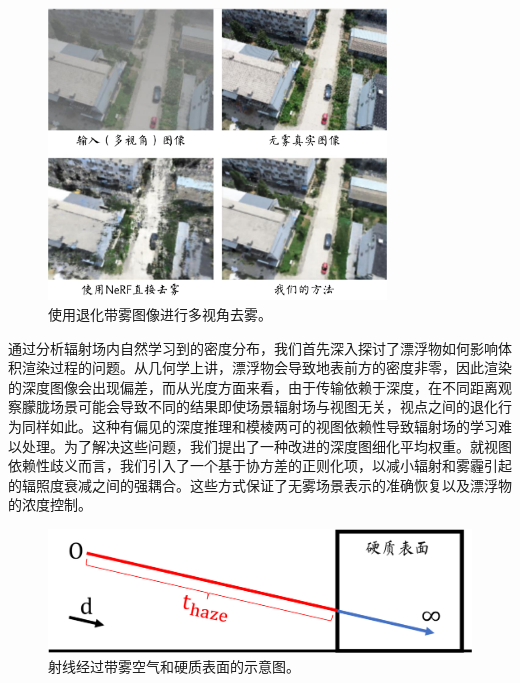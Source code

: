 \begin{figure}[ht]
    \centering
    \includegraphics[width=0.8\textwidth]{undergraduate-thesis/images/dehazing-nerf/teaser.pdf}
    \caption{使用退化带雾图像进行多视角去雾。}
    \label{fig:dehazing-nerf teaser}
\end{figure}

通过分析辐射场内自然学习到的密度分布，我们首先深入探讨了漂浮物如何影响体积渲染过程的问题。从几何学上讲，漂浮物会导致地表前方的密度非零，因此渲染的深度图像会出现偏差，而从光度方面来看，由于传输依赖于深度，在不同距离观察朦胧场景可能会导致不同的结果即使场景辐射场与视图无关，视点之间的退化行为同样如此。这种有偏见的深度推理和模棱两可的视图依赖性导致辐射场的学习难以处理。为了解决这些问题，我们提出了一种改进的深度图细化平均权重。就视图依赖性歧义而言，我们引入了一个基于协方差的正则化项，以减小辐射和雾霾引起的辐照度衰减之间的强耦合。这些方式保证了无雾场景表示的准确恢复以及漂浮物的浓度控制。

\begin{figure}[ht]
    \centering
    \includegraphics[width=\textwidth]{undergraduate-thesis/images/dehazing-nerf/t-haze.pdf}
    \caption{射线经过带雾空气和硬质表面的示意图。}
    \label{fig:dehazing-nerf t-haze decomposition}
\end{figure}

